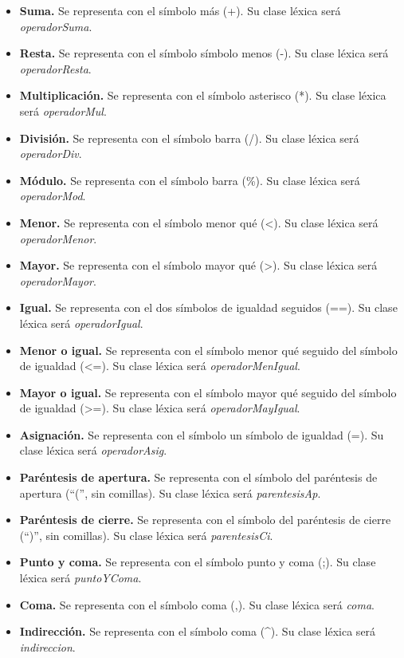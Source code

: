 \begin{itemize}
    \item \textbf{Suma.} Se representa con el símbolo más (+). Su clase léxica será \textit{operadorSuma}.
    \item \textbf{Resta.} Se representa con el símbolo símbolo menos (-). Su clase léxica será \textit{operadorResta}.
    \item \textbf{Multiplicación.} Se representa con el símbolo asterisco (*). Su clase léxica será \textit{operadorMul}.
    \item \textbf{División.} Se representa con el símbolo barra (/). Su clase léxica será \textit{operadorDiv}.
    \item \textbf{Módulo.} Se representa con el símbolo barra (\%). Su clase léxica será \textit{operadorMod}.
    \item \textbf{Menor.} Se representa con el símbolo menor qué (<). Su clase léxica será \textit{operadorMenor}.
    \item \textbf{Mayor.} Se representa con el símbolo mayor qué (>). Su clase léxica será \textit{operadorMayor}.
    \item \textbf{Igual.} Se representa con el dos símbolos de igualdad seguidos (==). Su clase léxica será \textit{operadorIgual}.
    \item \textbf{Menor o igual.} Se representa con el símbolo menor qué seguido del símbolo de igualdad (<=). Su clase léxica será \textit{operadorMenIgual}.
    \item \textbf{Mayor o igual.} Se representa con el símbolo mayor qué seguido del símbolo de igualdad (>=). Su clase léxica será \textit{operadorMayIgual}.
    \item \textbf{Asignación.} Se representa con el símbolo un símbolo de igualdad (=). Su clase léxica será \textit{operadorAsig}.
    \item \textbf{Paréntesis de apertura.} Se representa con el símbolo del paréntesis de apertura (``('', sin comillas). Su clase léxica será \textit{parentesisAp}.
    \item \textbf{Paréntesis de cierre.} Se representa con el símbolo del paréntesis de cierre (``)'', sin comillas). Su clase léxica será \textit{parentesisCi}.
    \item \textbf{Punto y coma.} Se representa con el símbolo punto y coma (;). Su clase léxica será \textit{puntoYComa}.
    \item \textbf{Coma.} Se representa con el símbolo coma (,). Su clase léxica será \textit{coma}.
    \item \textbf{Indirección.} Se representa con el símbolo coma (^). Su clase léxica será \textit{indireccion}.

\end{itemize}
